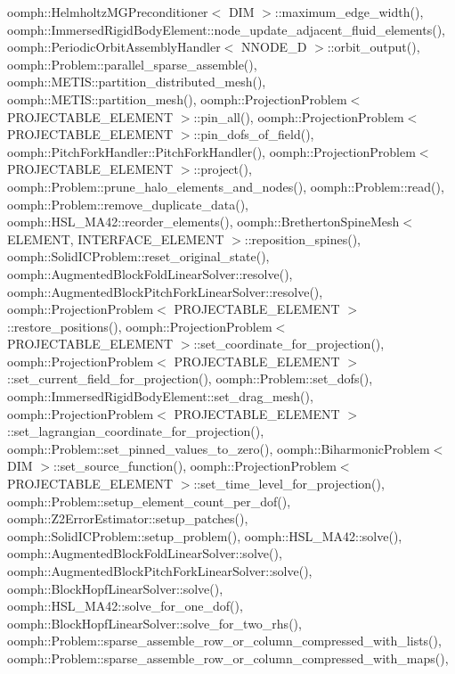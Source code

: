 oomph\+::\+Helmholtz\+M\+G\+Preconditioner$<$ D\+I\+M $>$\+::maximum\+\_\+edge\+\_\+width(), oomph\+::\+Immersed\+Rigid\+Body\+Element\+::node\+\_\+update\+\_\+adjacent\+\_\+fluid\+\_\+elements(), oomph\+::\+Periodic\+Orbit\+Assembly\+Handler$<$ N\+N\+O\+D\+E\+\_\+D $>$\+::orbit\+\_\+output(), oomph\+::\+Problem\+::parallel\+\_\+sparse\+\_\+assemble(), oomph\+::\+M\+E\+T\+I\+S\+::partition\+\_\+distributed\+\_\+mesh(), oomph\+::\+M\+E\+T\+I\+S\+::partition\+\_\+mesh(), oomph\+::\+Projection\+Problem$<$ P\+R\+O\+J\+E\+C\+T\+A\+B\+L\+E\+\_\+\+E\+L\+E\+M\+E\+N\+T $>$\+::pin\+\_\+all(), oomph\+::\+Projection\+Problem$<$ P\+R\+O\+J\+E\+C\+T\+A\+B\+L\+E\+\_\+\+E\+L\+E\+M\+E\+N\+T $>$\+::pin\+\_\+dofs\+\_\+of\+\_\+field(), oomph\+::\+Pitch\+Fork\+Handler\+::\+Pitch\+Fork\+Handler(), oomph\+::\+Projection\+Problem$<$ P\+R\+O\+J\+E\+C\+T\+A\+B\+L\+E\+\_\+\+E\+L\+E\+M\+E\+N\+T $>$\+::project(), oomph\+::\+Problem\+::prune\+\_\+halo\+\_\+elements\+\_\+and\+\_\+nodes(), oomph\+::\+Problem\+::read(), oomph\+::\+Problem\+::remove\+\_\+duplicate\+\_\+data(), oomph\+::\+H\+S\+L\+\_\+\+M\+A42\+::reorder\+\_\+elements(), oomph\+::\+Bretherton\+Spine\+Mesh$<$ E\+L\+E\+M\+E\+N\+T, I\+N\+T\+E\+R\+F\+A\+C\+E\+\_\+\+E\+L\+E\+M\+E\+N\+T $>$\+::reposition\+\_\+spines(), oomph\+::\+Solid\+I\+C\+Problem\+::reset\+\_\+original\+\_\+state(), oomph\+::\+Augmented\+Block\+Fold\+Linear\+Solver\+::resolve(), oomph\+::\+Augmented\+Block\+Pitch\+Fork\+Linear\+Solver\+::resolve(), oomph\+::\+Projection\+Problem$<$ P\+R\+O\+J\+E\+C\+T\+A\+B\+L\+E\+\_\+\+E\+L\+E\+M\+E\+N\+T $>$\+::restore\+\_\+positions(), oomph\+::\+Projection\+Problem$<$ P\+R\+O\+J\+E\+C\+T\+A\+B\+L\+E\+\_\+\+E\+L\+E\+M\+E\+N\+T $>$\+::set\+\_\+coordinate\+\_\+for\+\_\+projection(), oomph\+::\+Projection\+Problem$<$ P\+R\+O\+J\+E\+C\+T\+A\+B\+L\+E\+\_\+\+E\+L\+E\+M\+E\+N\+T $>$\+::set\+\_\+current\+\_\+field\+\_\+for\+\_\+projection(), oomph\+::\+Problem\+::set\+\_\+dofs(), oomph\+::\+Immersed\+Rigid\+Body\+Element\+::set\+\_\+drag\+\_\+mesh(), oomph\+::\+Projection\+Problem$<$ P\+R\+O\+J\+E\+C\+T\+A\+B\+L\+E\+\_\+\+E\+L\+E\+M\+E\+N\+T $>$\+::set\+\_\+lagrangian\+\_\+coordinate\+\_\+for\+\_\+projection(), oomph\+::\+Problem\+::set\+\_\+pinned\+\_\+values\+\_\+to\+\_\+zero(), oomph\+::\+Biharmonic\+Problem$<$ D\+I\+M $>$\+::set\+\_\+source\+\_\+function(), oomph\+::\+Projection\+Problem$<$ P\+R\+O\+J\+E\+C\+T\+A\+B\+L\+E\+\_\+\+E\+L\+E\+M\+E\+N\+T $>$\+::set\+\_\+time\+\_\+level\+\_\+for\+\_\+projection(), oomph\+::\+Problem\+::setup\+\_\+element\+\_\+count\+\_\+per\+\_\+dof(), oomph\+::\+Z2\+Error\+Estimator\+::setup\+\_\+patches(), oomph\+::\+Solid\+I\+C\+Problem\+::setup\+\_\+problem(), oomph\+::\+H\+S\+L\+\_\+\+M\+A42\+::solve(), oomph\+::\+Augmented\+Block\+Fold\+Linear\+Solver\+::solve(), oomph\+::\+Augmented\+Block\+Pitch\+Fork\+Linear\+Solver\+::solve(), oomph\+::\+Block\+Hopf\+Linear\+Solver\+::solve(), oomph\+::\+H\+S\+L\+\_\+\+M\+A42\+::solve\+\_\+for\+\_\+one\+\_\+dof(), oomph\+::\+Block\+Hopf\+Linear\+Solver\+::solve\+\_\+for\+\_\+two\+\_\+rhs(), oomph\+::\+Problem\+::sparse\+\_\+assemble\+\_\+row\+\_\+or\+\_\+column\+\_\+compressed\+\_\+with\+\_\+lists(), oomph\+::\+Problem\+::sparse\+\_\+assemble\+\_\+row\+\_\+or\+\_\+column\+\_\+compressed\+\_\+with\+\_\+maps(), 